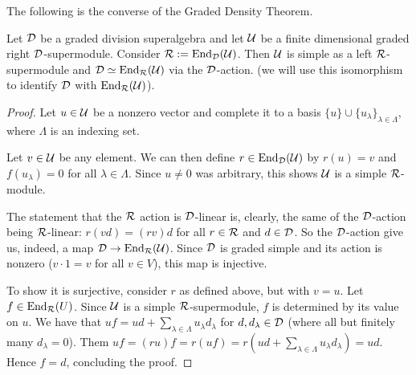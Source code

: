 The following is the converse of the Graded Density Theorem.

\begin{prop}\label{prop:converse-density-thm}
	Let $\mathcal{D}$ be a graded division superalgebra and let $\mathcal U$ be a finite dimensional graded right $\mathcal{D}$-supermodule. Consider $\mathcal R := \operatorname{End}_{\mathcal{D}} (\mathcal U)$. Then $\mathcal U$ is simple as a left $\mathcal R$-supermodule and $\mathcal{D} \simeq \operatorname{End}_{\mathcal R} (\mathcal U)$ via the $\mathcal{D}$-action.
	(we will use this isomorphism to identify $\mathcal{D}$ with $\operatorname{End}_{\mathcal R} (\mathcal U)$).
\end{prop}

\begin{proof}
	Let $u \in \mathcal U$ be a nonzero vector and complete it to a basis $\{u\} \cup \{ u_\lambda\}_{\lambda \in \Lambda}$, where $\Lambda$ is an indexing set.

	Let $v\in \mathcal U$ be any element. We can then define $r\in \operatorname{End}_{\mathcal{D}} (\mathcal U)$ by $r(u) = v$ and $f(u_\lambda) = 0$ for all $\lambda \in \Lambda$. Since $u \neq 0$ was arbitrary, this shows $\mathcal U$ is a simple $\mathcal R$-module.

	The statement that the $\mathcal R$ action is $\mathcal{D}$-linear is, clearly, the same of the $\mathcal{D}$-action being $\mathcal R$-linear: $r(vd) = (rv)d$ for all $r\in \mathcal R$ and $d \in \mathcal{D}$. So the $\mathcal{D}$-action give us, indeed, a map $\mathcal{D} \to \operatorname{End}_{\mathcal R} (\mathcal U)$.
	Since $\mathcal{D}$ is graded simple and its action is nonzero ($v\cdot 1 = v$ for all $v \in V$), this map is injective.

	To show it is surjective, consider $r$ as defined above, but with $v = u$. Let $f\in \operatorname{End}_{\mathcal R} (U)$. Since $\mathcal U$ is a simple $\mathcal R$-supermodule, $f$ is determined by its value on $u$.
	We have that $uf = u d + \sum_{\lambda \in \Lambda} u_\lambda d_\lambda$ for $d, d_\lambda \in \mathcal{D}$ (where all but finitely many $d_\lambda = 0$).
	Them $ uf = (ru)f = r(uf) = r(ud + \sum_{\lambda \in \Lambda} u_\lambda d_\lambda )  = ud$. Hence $f = d$, concluding the proof.
\end{proof}



